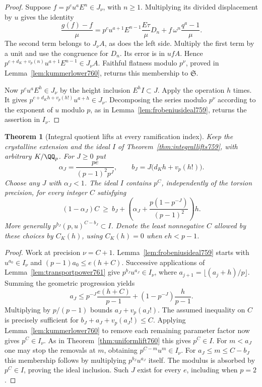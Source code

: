\documentclass[a4paper,11pt]{article}
\newtheorem{theorem}[proposition]{Theorem}
\theoremstyle{definition}
\theoremstyle{remark}
\numberwithin{equation}{section}
\begin{document}
\begin{proof}
Suppose \(f=p^c u^a E^n\in J_\nu\), with \(n\ge1\). Multiplying
its divided displacement by \(u\) gives the identity
\[
 \frac{g(f)-f}{\mu}
  =p^c u^{a+1}E^{n-1}\frac{E\tau}{\mu}D_n
                       + f\,\omega^n\frac{q^a-1}{\mu}.
\]
The second term belongs to \(J_\nu A\), as does the left side.
Multiply the first term by a unit and use the congruence for
\(D_n\). Its error is in \(ufA\). Hence
\(p^{c+d_K+v_p(n)}u^{a+1}E^{n-1}\in J_\nu A\).
Faithful flatness modulo \(p^\nu\), proved in
Lemma~\ref{lem:kummerlower760}, returns this membership to
\(\mathfrak S\).

Now \(p^c u^a E^h\in J_\nu\) by the height inclusion
\(E^h I\subset J\). Apply the operation \(h\) times. It
gives \(p^{c+d_Kh+v_p(h!)}u^{a+h}\in J_\nu\).
Decomposing the series modulo \(p^\nu\) according to the
exponent of \(u\) modulo \(p\), as in
Lemma~\ref{lem:frobeniusideal759}, returns the assertion
in \(I_\nu\).
\end{proof}

\begin{theorem}[Integral quotient lifts at every ramification index]
\leavevmode\label{thm:allramifiedlifts761}
Keep the crystalline extension and the ideal \(I\) of
Theorem~\ref{thm:integrallifts759}, with arbitrary \(K/\QQ_p\).
For \(J\ge0\) put
\[
 \alpha_J=\frac{pe}{(p-1)^2p^J},\qquad
 b_J=J\big(d_Kh+v_p(h!)\big).
\]
Choose any \(J\) with \(\alpha_J<1\). The ideal \(I\) contains
\(p^C\), independently of the torsion precision, for every
integer \(C\) satisfying
\[
 (1-\alpha_J)C\ \ge\
       b_J+\left(\alpha_J+
              \frac{p(1-p^{-J})}{(p-1)^2}\right)h.
\]
More generally \(p^{b_J}(p,u)^{C-b_J}\subset I\).
Denote the least nonnegative \(C\) allowed by these choices
by \(C_K(h)\), using \(C_K(h)=0\) when \(eh<p-1\).
\end{theorem}
\begin{proof}
Work at precision \(\nu=C+1\). Lemma~\ref{lem:frobeniusideal759}
starts with \(u^{a_0}\in I_\nu\) and
\((p-1)a_0\le e(h+C)\). Successive applications of
Lemma~\ref{lem:transportpower761} give \(p^{b_J}u^{a_J}\in
I_\nu\), where \(a_{j+1}=\lfloor(a_j+h)/p\rfloor\). Summing
the geometric progression yields
\[
 a_J\le p^{-J}\frac{e(h+C)}{p-1}
                     +(1-p^{-J})\frac h{p-1}.
\]
Multiplying by \(p/(p-1)\) bounds \(a_J+v_p(a_J!)\).
The assumed inequality on \(C\) is precisely sufficient for
\(b_J+a_J+v_p(a_J!)\le C\). Applying
Lemma~\ref{lem:kummerlower760} to remove each remaining
parameter factor now gives \(p^C\in I_\nu\). As in
Theorem~\ref{thm:uniformlift760} this gives \(p^C\in I\).
For \(m<a_J\) one may stop the removals at \(m\), obtaining
\(p^{C-m}u^m\in I_\nu\). For \(a_J\le m\le C-b_J\) this
membership follows by multiplying \(p^{b_J}u^{a_J}\) itself.
The modulus is absorbed by \(p^C\in I\), proving the ideal
inclusion. Such \(J\) exist for every \(e\), including
when \(p=2\).
\end{proof}
\end{document}
